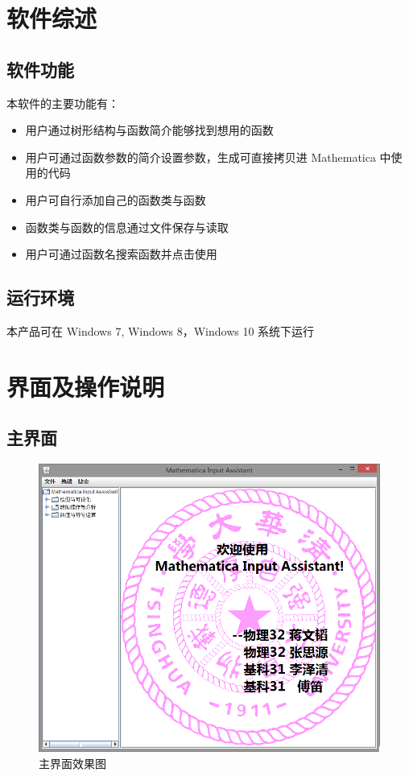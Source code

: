 \documentclass[hyperref, UTF8
,bookmarksnumbered=true, oneside]{ctexbook}
\begin{document}


	



\chapter{软件综述}

	\section{软件功能} %
	本软件的主要功能有：
	\label{sec:}
		\begin{itemize}
			\item 用户通过树形结构与函数简介能够找到想用的函数
			\item 用户可通过函数参数的简介设置参数，生成可直接拷贝进 Mathematica 中使
用的代码
			\item 用户可自行添加自己的函数类与函数
			\item 函数类与函数的信息通过文件保存与读取
			\item 用户可通过函数名搜索函数并点击使用
		\end{itemize}
	
	\section{运行环境} %
		

		本产品可在 Windows 7, Windows 8，Windows 10 系统下运行

\chapter{界面及操作说明}

	\section{主界面} %

		\begin{figure}[!h]
			\centering
			\includegraphics[width=5in]{Welcome.png}
			\caption{主界面效果图}	
		\end{figure}
\end{document}
